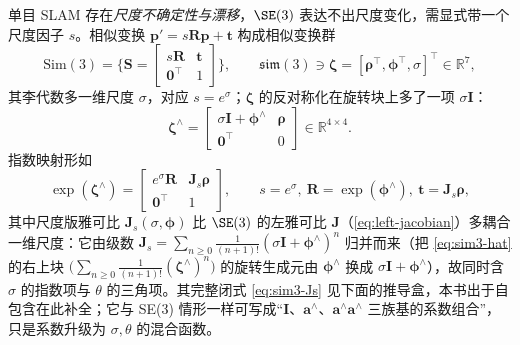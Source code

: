 单目 SLAM 存在\emph{尺度不确定性与漂移}，$\SE(3)$ 表达不出尺度变化，需显式带一个尺度因子 $s$。相似变换 $\mathbf{p}'=s\mathbf{R}\mathbf{p}+\mathbf{t}$ 构成相似变换群
\begin{equation}
  \mathrm{Sim}(3)=\Big\{\mathbf{S}=\begin{bmatrix}s\mathbf{R}&\mathbf{t}\\\mathbf{0}^\top&1\end{bmatrix}\Big\},\qquad
  \mathfrak{sim}(3)\ni\boldsymbol{\zeta}=[\boldsymbol{\rho}^\top,\boldsymbol{\phi}^\top,\sigma]^\top\in\mathbb{R}^7,
  \label{eq:sim3}
\end{equation}
其李代数多一维尺度 $\sigma$，对应 $s=e^{\sigma}$；$\boldsymbol{\zeta}$ 的反对称化在旋转块上多了一项 $\sigma\mathbf{I}$：
\begin{equation}
  \boldsymbol{\zeta}^\wedge=\begin{bmatrix}\sigma\mathbf{I}+\boldsymbol{\phi}^\wedge&\boldsymbol{\rho}\\\mathbf{0}^\top&0\end{bmatrix}\in\mathbb{R}^{4\times4}.
  \label{eq:sim3-hat}
\end{equation}
指数映射形如
\begin{equation}
  \exp(\boldsymbol{\zeta}^\wedge)=\begin{bmatrix}e^{\sigma}\mathbf{R}&\mathbf{J}_s\boldsymbol{\rho}\\\mathbf{0}^\top&1\end{bmatrix},
  \qquad s=e^\sigma,\ \mathbf{R}=\exp(\boldsymbol{\phi}^\wedge),\ \mathbf{t}=\mathbf{J}_s\boldsymbol{\rho},
  \label{eq:sim3-exp}
\end{equation}
其中尺度版雅可比 $\mathbf{J}_s(\sigma,\boldsymbol{\phi})$ 比 $\SE(3)$ 的左雅可比 $\mathbf{J}$（\cref{eq:left-jacobian}）多耦合一维尺度：它由级数 $\mathbf{J}_s=\sum_{n\ge0}\frac{1}{(n+1)!}(\sigma\mathbf{I}+\boldsymbol{\phi}^\wedge)^n$ 归并而来（把 \cref{eq:sim3-hat} 的右上块 $\big(\sum_{n\ge0}\frac{1}{(n+1)!}(\boldsymbol{\zeta}^\wedge)^n\big)$ 的旋转生成元由 $\boldsymbol{\phi}^\wedge$ 换成 $\sigma\mathbf{I}+\boldsymbol{\phi}^\wedge$），故同时含 $\sigma$ 的指数项与 $\theta$ 的三角项。其完整闭式 \cref{eq:sim3-Js} 见下面的推导盒，本书出于自包含在此补全；它与 SE(3) 情形一样可写成“$\mathbf{I}$、$\mathbf{a}^\wedge$、$\mathbf{a}^\wedge\mathbf{a}^\wedge$ 三族基的系数组合”，只是系数升级为 $\sigma,\theta$ 的混合函数。


